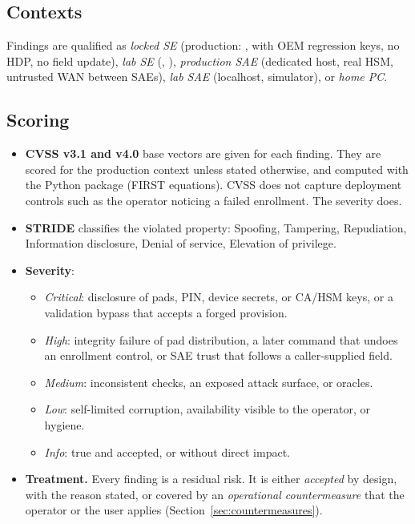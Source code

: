 \documentclass[11pt,a4paper]{article}
\begin{document}
\subsection{Contexts}
Findings are qualified as \emph{locked SE} (production: ,  with OEM regression keys, no HDP, no field update), \emph{lab SE} (, ), \emph{production SAE} (dedicated host, real HSM, untrusted WAN between SAEs), \emph{lab SAE} (localhost, simulator), or \emph{home PC}.

\subsection{Scoring}
\begin{itemize}
\item \textbf{CVSS v3.1 and v4.0} base vectors are given for each finding. They are scored for the production context unless stated otherwise, and computed with the  Python package (FIRST equations). CVSS does not capture deployment controls such as the operator noticing a failed enrollment. The severity does.
\item \textbf{STRIDE} classifies the violated property: Spoofing, Tampering, Repudiation, Information disclosure, Denial of service, Elevation of privilege.
\item \textbf{Severity}:
  \begin{itemize}
  \item \emph{Critical}: disclosure of pads, PIN, device secrets, or CA/HSM keys, or a validation bypass that accepts a forged provision.
  \item \emph{High}: integrity failure of pad distribution, a later command that undoes an enrollment control, or SAE trust that follows a caller-supplied field.
  \item \emph{Medium}: inconsistent checks, an exposed attack surface, or oracles.
  \item \emph{Low}: self-limited corruption, availability visible to the operator, or hygiene.
  \item \emph{Info}: true and accepted, or without direct impact.
  \end{itemize}
\item \textbf{Treatment.} Every finding is a residual risk. It is either \emph{accepted} by design, with the reason stated, or covered by an \emph{operational countermeasure} that the operator or the user applies (Section~\ref{sec:countermeasures}).
\end{itemize}
\end{document}
